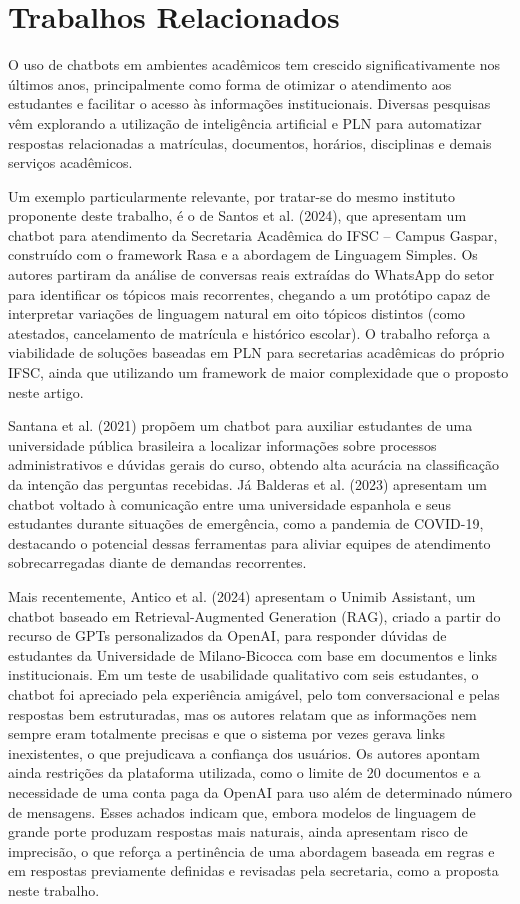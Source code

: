 \documentclass[12pt]{article}
\begin{document}
\section{Trabalhos Relacionados}\label{sec:trabalhos}

O uso de chatbots em ambientes acadêmicos tem crescido significativamente
nos últimos anos, principalmente como forma de otimizar o atendimento aos
estudantes e facilitar o acesso às informações institucionais. Diversas
pesquisas vêm explorando a utilização de inteligência artificial e PLN
para automatizar respostas relacionadas a matrículas, documentos,
horários, disciplinas e demais serviços acadêmicos.

Um exemplo particularmente relevante, por tratar-se do mesmo instituto
proponente deste trabalho, é o de Santos et al. (2024), que apresentam um
chatbot para atendimento da Secretaria Acadêmica do IFSC -- Campus
Gaspar, construído com o framework Rasa e a abordagem de Linguagem
Simples. Os autores partiram da análise de conversas reais extraídas do
WhatsApp do setor para identificar os tópicos mais recorrentes, chegando
a um protótipo capaz de interpretar variações de linguagem natural em
oito tópicos distintos (como atestados, cancelamento de matrícula e
histórico escolar). O trabalho reforça a viabilidade de soluções baseadas
em PLN para secretarias acadêmicas do próprio IFSC, ainda que utilizando
um framework de maior complexidade que o proposto neste artigo.

Santana et al. (2021) propõem um chatbot para auxiliar estudantes de uma
universidade pública brasileira a localizar informações sobre processos
administrativos e dúvidas gerais do curso, obtendo alta acurácia na
classificação da intenção das perguntas recebidas. Já Balderas et al.
(2023) apresentam um chatbot voltado à comunicação entre uma
universidade espanhola e seus estudantes durante situações de
emergência, como a pandemia de COVID-19, destacando o potencial dessas
ferramentas para aliviar equipes de atendimento sobrecarregadas diante de
demandas recorrentes.

Mais recentemente, Antico et al. (2024) apresentam o Unimib Assistant,
um chatbot baseado em Retrieval-Augmented Generation (RAG), criado a
partir do recurso de GPTs personalizados da OpenAI, para responder
dúvidas de estudantes da Universidade de Milano-Bicocca com base em
documentos e links institucionais. Em um teste de usabilidade qualitativo
com seis estudantes, o chatbot foi apreciado pela experiência amigável,
pelo tom conversacional e pelas respostas bem estruturadas, mas os
autores relatam que as informações nem sempre eram totalmente precisas e
que o sistema por vezes gerava links inexistentes, o que prejudicava a
confiança dos usuários. Os autores apontam ainda restrições da plataforma
utilizada, como o limite de 20 documentos e a necessidade de uma conta
paga da OpenAI para uso além de determinado número de mensagens. Esses
achados indicam que, embora modelos de linguagem de grande porte
produzam respostas mais naturais, ainda apresentam risco de imprecisão,
o que reforça a pertinência de uma abordagem baseada em regras e em
respostas previamente definidas e revisadas pela secretaria, como a
proposta neste trabalho.
\end{document}
